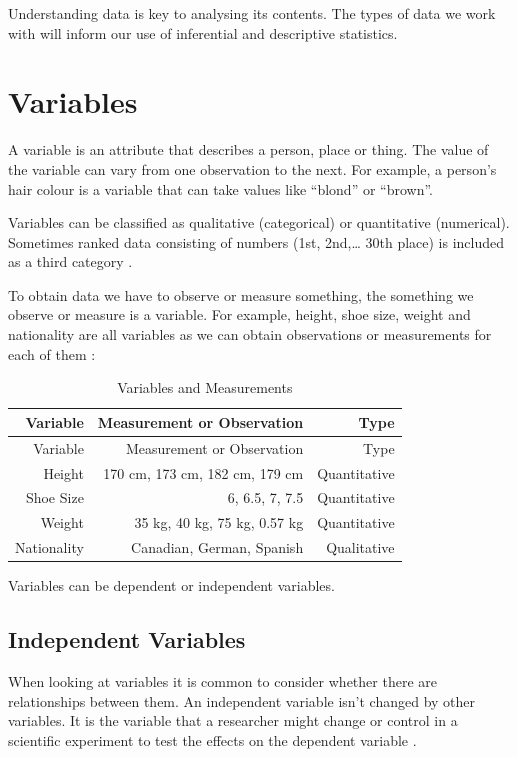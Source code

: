 \documentclass[
]{book}
\begin{document}
Understanding data is key to analysing its contents. The types of data we work with will inform our use of inferential and descriptive statistics.

\hypertarget{variables}{%
\section{Variables}\label{variables}}

A variable is an attribute that describes a person, place or thing. The value of the variable can vary from one observation to the next. For example, a person's hair colour is a variable that can take values like ``blond'' or ``brown''.

Variables can be classified as qualitative (categorical) or quantitative (numerical). Sometimes ranked data consisting of numbers (1st, 2nd,\ldots{} 30th place) is included as a third category \citep{Witte2017}.

To obtain data we have to observe or measure something, the something we observe or measure is a variable. For example, height, shoe size, weight and nationality are all variables as we can obtain observations or measurements for each of them \citep{Campbell2021}:

\begin{longtable}[]{@{}rrr@{}}
\caption{\label{tab:table000} Variables and Measurements}\tabularnewline
\toprule
Variable & Measurement or Observation & Type \\
\midrule
\endfirsthead
\toprule
Variable & Measurement or Observation & Type \\
\midrule
\endhead
Height & 170 cm, 173 cm, 182 cm, 179 cm & Quantitative \\
Shoe Size & 6, 6.5, 7, 7.5 & Quantitative \\
Weight & 35 kg, 40 kg, 75 kg, 0.57 kg & Quantitative \\
Nationality & Canadian, German, Spanish & Qualitative \\
\bottomrule
\end{longtable}

Variables can be dependent or independent variables.

\hypertarget{independent-variables}{%
\subsection{Independent Variables}\label{independent-variables}}

When looking at variables it is common to consider whether there are relationships between them. An independent variable isn't changed by other variables. It is the variable that a researcher might change or control in a scientific experiment to test the effects on the dependent variable \citep{Witte2017}.
\end{document}
